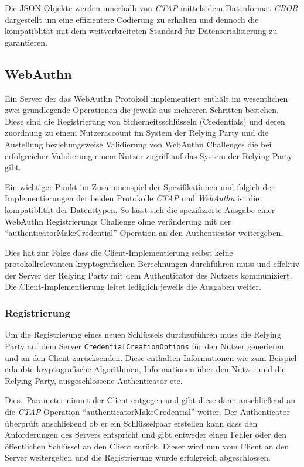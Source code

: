 \documentclass[journal]{IEEEtran}
\begin{document}
Die JSON Objekte werden innerhalb von \textit{CTAP} mittels dem Datenformat
\textit{CBOR} dargestellt um eine effizientere Codierung zu erhalten und
dennoch die kompatiblität mit dem weitverbreiteten Standard für
Datenserialisierung zu garantieren.~\cite{cborspec}

\subsection{WebAuthn}

Ein Server der das WebAuthn Protokoll implementiert enthält im wesentlichen
zwei grundlegende Operationen die jeweils aus mehreren Schritten bestehen.
Diese sind die Registrierung von Sicherheitsschlüsseln (Credentials) und deren
zuordnung zu einem Nutzeraccount im System der Relying Party und die
Austellung beziehungsweise Validierung von WebAuthn Challenges die bei
erfolgreicher Validierung einem Nutzer zugriff auf das System der Relying Party
gibt.

Ein wichtiger Punkt im Zusammenspiel der Spezifikationen und folgich der
Implementierungen der beiden Protokolle \textit{CTAP} und \textit{WebAuthn} ist
die kompatiblität der Datenttypen. So lässt sich die spezifizierte Ausgabe
einer WebAuthn Registrierungs Challenge ohne veränderung mit der
``authenticatorMakeCredential'' Operation an den Authenticator
weitergeben.~\cite{ctapspec, webauthnspec}

Dies hat zur Folge dass die Client-Implementierung selbst keine
protokollrelevanten kryptografischen Berechnungen durchführen muss und effektiv
der Server der Relying Party mit dem Authenticator des Nutzers kommuniziert.
Die Client-Implementierung leitet lediglich jeweils die Ausgaben
weiter.~\cite{webauthnspec}

\subsubsection{Registrierung}

Um die Registrierung eines neuen Schlüssels durchzuführen muss die Relying
Party auf dem Server \texttt{CredentialCreationOptions} für den Nutzer
generieren und an den Client zurücksenden. Diese enthalten Informationen wie
zum Beispiel erlaubte kryptografische Algorithmen, Informationen über den
Nutzer und die Relying Party, ausgeschlossene Authenticator
etc.~\cite{webauthnspec}

Diese Parameter nimmt der Client entgegen und gibt diese dann anschließend an
die \textit{CTAP}-Operation ``authenticatorMakeCredential'' weiter. Der
Authenticator überprüft anschließend ob er ein Schlüsselpaar erstellen kann
dass den Anforderungen des Servers entspricht und gibt entweder einen Fehler
oder den öffentlichen Schlüssel an den Client zurück. Dieser wird nun vom
Client an den Server weitergeben und die Registrierung wurde erfolgreich
abgeschlossen.~\cite{ctapspec, webauthnspec}
\end{document}
